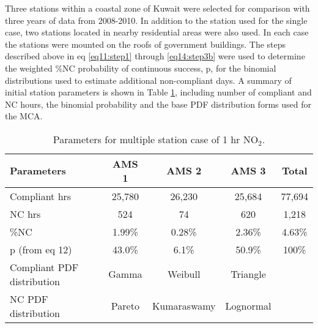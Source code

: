 Three stations within a coastal zone of Kuwait were selected for comparison with three years of data from 2008-2010. In addition to the station used for the single case, two stations located in nearby residential areas were also used. In each case the stations were mounted on the roofs of government buildings. The steps described above in eq \ref{eq11:step1} through \ref{eq14:step3b} were used to determine the weighted \%NC probability of continuous success, p, for the binomial distributions used to estimate additional non-compliant days. A summary of initial station parameters is shown in Table \ref{tb10:multiParaNO2}, including number of compliant and NC hours, the binomial probability and the base PDF distribution forms used for the MCA.
% 
\begin{table}[!htb]
\centering
\caption{Parameters for multiple station case of 1 hr NO$_{2}$.}
\label{tb10:multiParaNO2}
\begin{tabular}{@{}lcccc@{}}
\toprule
\textbf{Parameters} & \textbf{AMS 1} & \textbf{AMS 2} & \textbf{AMS 3} & \textbf{Total} \\ \midrule
Compliant hrs & 25,780 & 26,230 & 25,684 & 77,694 \\
NC hrs & 524 & 74 & 620 & 1,218 \\
\%NC & 1.99\% & 0.28\% & 2.36\% & 4.63\% \\
p (from eq 12) & 43.0\% & 6.1\% & 50.9\% & 100\% \\
Compliant PDF distribution & Gamma & Weibull & Triangle &  \\
NC PDF distribution & Pareto & Kumaraswamy & Lognormal &  \\ \bottomrule
\end{tabular}
\end{table} 

